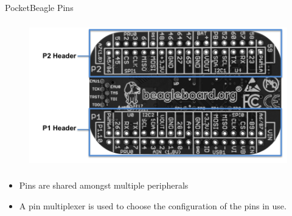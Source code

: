 \begin{frame}
   {PocketBeagle Pins}
   \begin{figure}[H]
      \includegraphics[height=2.5in]{IMAGES/pocketbeagle-headers}
   \end{figure}
   \begin{itemize}
      \item Pins are shared amongst multiple peripherals
      \item A pin multiplexer is used to choose the configuration of the pins in use.
   \end{itemize}
\end{frame}

\cprotect{}

